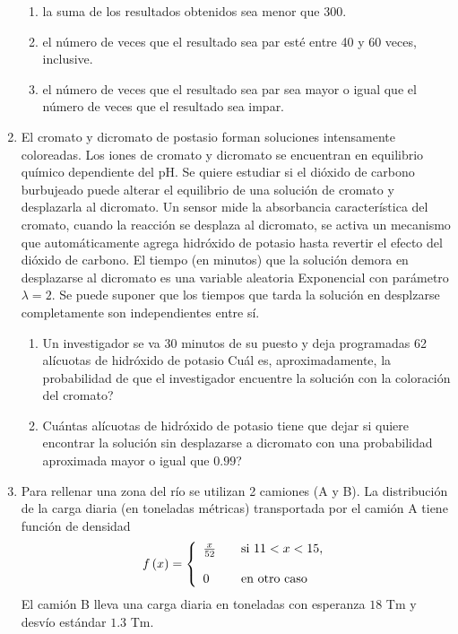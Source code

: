 \documentclass[a4paper, 11pt]{article}
\begin{document}
\begin{enumerate}
\begin{enumerate}
\item la suma de los resultados obtenidos sea menor que 300.


\item el número de veces que el resultado sea par esté entre 40 y 60
veces, inclusive.


\item el número de veces que el resultado sea par sea mayor o igual que el
número de veces que el resultado sea impar.
\end{enumerate}


\item El cromato y dicromato de postasio forman soluciones intensamente coloreadas. Los iones de cromato y dicromato se encuentran en equilibrio químico dependiente del pH. Se quiere estudiar si el dióxido de carbono burbujeado puede alterar el equilibrio de una solución de cromato y desplazarla al dicromato. Un sensor mide la absorbancia característica del cromato, cuando la reacción se desplaza al dicromato, se activa un mecanismo que automáticamente agrega hidróxido de potasio hasta revertir el efecto del dióxido de carbono. El tiempo (en minutos) que la solución demora en desplazarse al dicromato es una variable aleatoria Exponencial con parámetro
$\lambda=2$. Se puede suponer que los tiempos que tarda la solución en desplzarse completamente son independientes entre sí.


\begin{enumerate}
\item Un investigador se va 30 minutos de su puesto y deja programadas 62
alícuotas de hidróxido de potasio
\textquestiondown Cuál es, aproximadamente, la probabilidad de que el investigador encuentre la solución con la coloración del cromato?


\item \textquestiondown Cuántas alícuotas de hidróxido de potasio tiene que dejar si quiere encontrar la solución sin desplazarse a dicromato con una probabilidad aproximada
mayor o igual que $0.99$?
\end{enumerate}




\item Para rellenar una zona del río se utilizan 2 camiones (A y B). La
distribución de la carga diaria (en toneladas métricas) transportada
por el camión A tiene función de densidad
\[
f\left(  x\right)  =\left\{
\begin{array}
[c]{lll}%
\frac{x}{52} &  & \text{si }11<x<15,\\
&  & \\
0 &  & \text{en otro caso}%
\end{array}
\right.
\]
El camión B lleva una carga diaria en toneladas con esperanza $18$ Tm y
desvío estándar $1.3$ Tm.



\end{enumerate}
\end{document}
